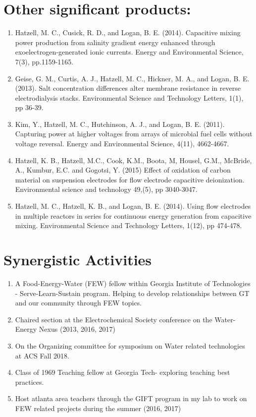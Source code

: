 \section{Other significant products:}\label{MCH-other-significant-products}

\begin{enumerate}
\def\labelenumi{\arabic{enumi}.}
\item
Hatzell, M. C., Cusick, R. D., and Logan, B. E. (2014). Capacitive mixing power production from salinity gradient energy enhanced through exoelectrogen-generated ionic currents. Energy and Environmental Science, 7(3), pp.1159-1165.
\item
Geise, G. M., Curtis, A. J., Hatzell, M. C., Hickner, M. A., and Logan, B. E. (2013). Salt concentration differences alter membrane resistance in reverse electrodialysis stacks. Environmental Science and Technology Letters, 1(1), pp 36-39.
\item
Kim, Y., Hatzell, M. C., Hutchinson, A. J., and Logan, B. E. (2011). Capturing power at higher voltages from arrays of microbial fuel cells without voltage reversal. Energy and Environmental Science, 4(11), 4662-4667.
\item
Hatzell, K. B., Hatzell, M.C., Cook, K.M., Boota, M, Housel, G.M., McBride, A., Kumbur, E.C. and Gogotsi, Y. (2015) Effect of oxidation of carbon material on suspension electrodes for flow electrode capacitive deionization. Environmental science and technology 49,(5), pp 3040-3047.
\item
Hatzell, M. C., Hatzell, K. B., and Logan, B. E. (2014). Using flow electrodes in multiple reactors in series for continuous energy generation from capacitive mixing. Environmental Science and Technology Letters, 1(12), pp 474-478.
\end{enumerate}

\section{Synergistic Activities}\label{MCH-synergistic-activities}

\begin{enumerate}
\def\labelenumi{\arabic{enumi}.}
\item
A Food-Energy-Water (FEW) fellow within Georgia Institute of Technologies - Serve-Learn-Sustain program. Helping to develop relationships between GT and our community through FEW topics. 
\item
Chaired section at the Electrochemical Society conference on the Water-Energy Nexus (2013, 2016, 2017)
  \item
 On the Organizing committee for symposium on Water related technologies at ACS Fall 2018. 
  \item
Class of 1969 Teaching fellow at Georgia Tech- exploring teaching best practices. 
  \item
Host atlanta area teachers through the GIFT program in my lab to work on FEW related projects during the summer (2016, 2017) 
\end{enumerate}